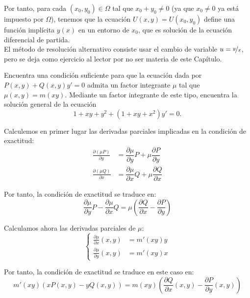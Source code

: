 \begin{ejercicio}
    Por tanto, para cada $(x_0, y_0)\in \Omega$ tal que $x_0+y_0\neq 0$ (ya que $x_0\neq 0$ ya está impuesto por $\Omega$), tenemos que la ecuación $U(x,y)=U(x_0,y_0)$ define una función implícita $y(x)$ en un entorno de $x_0$, que es solución de la ecuación diferencial de partida.\\

    El método de resolución alternativo consiste usar el cambio de variable $u=\nicefrac{y}{x}$, pero se deja como ejercicio al lector por no ser materia de este Capítulo.
\end{ejercicio}

\begin{ejercicio}
    Encuentra una condición suficiente para que la ecuación dada por $P(x, y) + Q(x, y)y' = 0$ admita un factor integrante $\mu$ tal que $\mu(x, y) = m(xy)$. Mediante un factor integrante de este tipo, encuentra la solución general de la ecuación
    \[
        1 + xy + y^2 + (1 + xy + x^2)y' = 0.
    \]

    Calculemos en primer lugar las derivadas parciales implicadas en la condición de exactitud:
    \begin{align*}
        \frac{\partial (\mu P)}{\partial y} &= \dfrac{\partial \mu}{\partial y}P+\mu\dfrac{\partial P}{\partial y}\\
        \frac{\partial (\mu Q)}{\partial x} &= \dfrac{\partial \mu}{\partial x}Q+\mu\dfrac{\partial Q}{\partial x}
    \end{align*}

    Por tanto, la condición de exactitud se traduce en:
    \begin{equation*}
        \dfrac{\partial \mu}{\partial y}P- \dfrac{\partial \mu}{\partial x}Q = \mu\left(\dfrac{\partial Q}{\partial x}-\dfrac{\partial P}{\partial y}\right)
    \end{equation*}

    Calculamos ahora las derivadas parciales de $\mu$:
    \begin{equation*}
        \left\{
            \begin{aligned}
                \frac{\partial \mu}{\partial x}(x,y) &= m'(xy)y\\
                \frac{\partial \mu}{\partial y}(x,y) &= m'(xy)x
            \end{aligned}
        \right.
    \end{equation*}

    Por tanto, la condición de exactitud se traduce en este caso en:
    \begin{equation*}
        m'(xy)(xP(x,y)-yQ(x,y)) = m(xy)\left(\frac{\partial Q}{\partial x}(x,y)-\frac{\partial P}{\partial y}(x,y)\right)
    \end{equation*}


\end{ejercicio}
